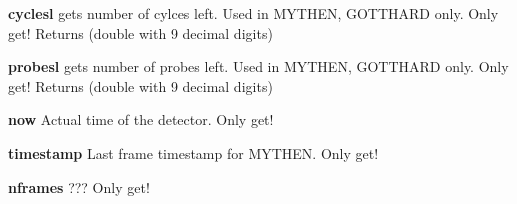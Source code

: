 \begin{DoxyItemize}
\item {\bfseries cyclesl} gets number of cylces left. Used in MYTHEN, GOTTHARD only. Only get! {\ttfamily Returns} {\ttfamily }(double with 9 decimal digits)
\end{DoxyItemize}


\begin{DoxyItemize}
\item {\bfseries probesl} gets number of probes left. Used in MYTHEN, GOTTHARD only. Only get! {\ttfamily Returns} {\ttfamily }(double with 9 decimal digits)
\end{DoxyItemize}


\begin{DoxyItemize}
\item {\bfseries now} Actual time of the detector. Only get!
\end{DoxyItemize}


\begin{DoxyItemize}
\item {\bfseries timestamp} Last frame timestamp for MYTHEN. Only get!
\end{DoxyItemize}


\begin{DoxyItemize}
\item {\bfseries nframes} ??? Only get! 
\end{DoxyItemize}